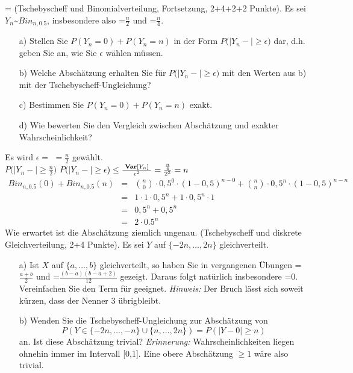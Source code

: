 \documentclass[twoside]{article}
\begin{document}
\ifnum\ZettelZehn=\True
{}
		(Tschebyscheff und Binomialverteilung, Fortsetzung, 2+4+2+2 Punkte).
		Es sei $Y_n$\textasciitilde$Bin_{n,0.5}$, insbesondere also =$\frac{n}{2}$ und =$\frac{n}{4}$.
		\begin{enumerate}
			\item[a)] Stellen Sie $P(Y_n=0)+P(Y_n=n)$ in der Form $P(|Y_n-$$|\geq \epsilon)$ dar, d.h. geben Sie an, wie Sie $\epsilon$ wählen müssen.
			\item[b)] Welche Abschätzung erhalten Sie für $P(|Y_n-$$|\geq\epsilon)$ mit den Werten aus b) mit der Tschebyscheff-Ungleichung?
			\item[c)] Bestimmen Sie $P(Y_n=0)+P(Y_n=n)$ exakt.
			\item[d)] Wie bewerten Sie den Vergleich zwischen Abschätzung und exakter Wahrscheinlichkeit?
		\end{enumerate}
		\sss
	Es wird $\epsilon  =$  $= \frac{n}{2}$ gewählt.\\
	$P(|Y_n-$$|\geq \frac{n}{2})$
		\sss
	$P(|Y_n-$$|\geq \epsilon) \leq \frac{\text{ \textbf{Var}[$Y_n$] }}{\epsilon^2} = \frac{\frac{n}{4}}{2^2}=n$
		\sss
    \begin{equation*}
        \begin{array}{rll}
            Bin_{n,0.5}(0) + Bin_{n,0.5}(n) &=&\binom{n}{0}\cdot 0,5^0\cdot(1-0,5)^{n-0} + \binom{n}{n}\cdot 0,5^n\cdot(1-0,5)^{n-n}\\
            &=&1\cdot 1\cdot 0,5^n+1\cdot 0,5^n\cdot1\\
            &=&0,5^n+0,5^n\\
            &=&2\cdot 0.5^n
        \end{array}
    \end{equation*}
		\sss
    Wie erwartet ist die Abschätzung ziemlich ungenau.
		(Tschebyscheff und diskrete Gleichverteilung, 2+4 Punkte).
		Es sei $Y$ auf $\{-2n,...,2n\}$ gleichverteilt.
		\begin{enumerate}
			\item[a)] Ist $X$ auf $\{a,...,b\}$ gleichverteilt, so haben Sie in vergangenen Übungen =$\frac{a+b}{2}$ und =$\frac{(b-a)(b-a+2)}{12}$ gezeigt.
					Daraus folgt natürlich insbesondere =0.
					Vereinfachen Sie den Term für  geeignet.
					\textit{Hinweis:} Der Bruch lässt sich soweit kürzen, dass der Nenner 3 übrigbleibt.
		\item[b)] Wenden Sie die Tschebyscheff-Ungleichung zur Abschätzung von
		\[
			P(Y \in \{-2n,...,-n\} \cup \{n,...,2n\})=P(|Y-0| \geq n)
		\]
					an.
					Ist diese Abschätzung trivial?
					\textit{Erinnerung:} Wahrscheinlichkeiten liegen ohnehin immer im Intervall [0,1].
					Eine obere Abschätzung $\geq 1$ wäre also trivial.
		\end{enumerate}
		
\end{document}
